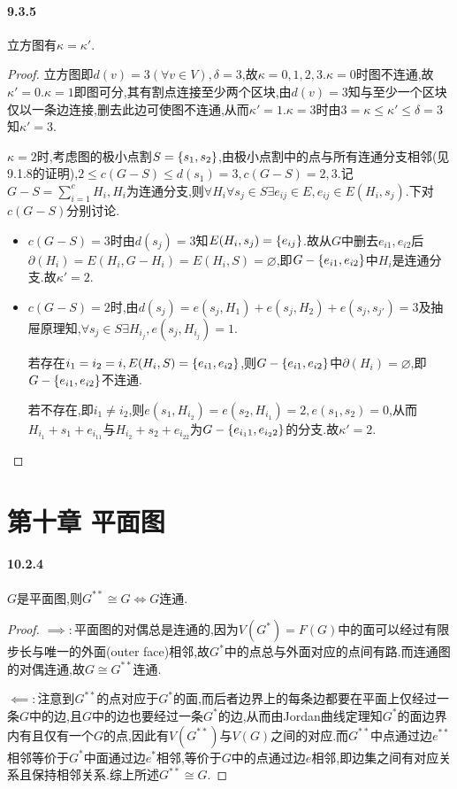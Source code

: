 \documentclass[11pt]{article}
\begin{document}
\paragraph{9.3.5}立方图有$\kappa=\kappa'$.
\begin{proof}
    立方图即$d(v)=3(\forall v\in V), \delta=3$,故$\kappa=0,1,2,3$.$\kappa=0$时图不连通,故$\kappa'=0$.$\kappa=1$即图可分,其有割点连接至少两个区块,由$d(v)=3$知与至少一个区块仅以一条边连接,删去此边可使图不连通,从而$\kappa'=1$.$\kappa=3$时由$3=\kappa\leq\kappa'\leq\delta=3$知$\kappa'=3$.
    
    $\kappa=2$时,考虑图的极小点割$S=\left\{s_1,s_2\right\}$,由极小点割中的点与所有连通分支相邻(见9.1.8的证明),$2\leq c(G-S)\leq d(s_1)=3, c(G-S)=2,3$.记$G-S=\sum_{i=1}^{c}H_i, H_i$为连通分支,则$\forall H_i\forall s_j\in S\exists e_{ij}\in E, e_{ij}\in E(H_i,s_j)$.下对$c(G-S)$分别讨论.
    \begin{itemize}
        \item $c(G-S)=3$时由$d(s_j)=3$知$E(H_i,s_j)=\left\{e_{ij}\right\}$.故从$G$中删去$e_{i1},e_{i2}$后$\partial(H_i)=E(H_i,G-H_i)=E(H_i,S)=\varnothing$,即$G-\left\{e_{i1},e_{i2}\right\}$中$H_i$是连通分支.故$\kappa'=2$.
        \item $c(G-S)=2$时,由$d(s_j)=e(s_j,H_1)+e(s_j,H_2)+e(s_j,s_{j'})=3$及抽屉原理知,$\forall s_j\in S\exists H_{i_j}, e(s_j,H_{i_j})=1$.
        
        若存在$i_1=i_2=i, E(H_i,S)=\left\{e_{i1},e_{i2}\right\}$,则$G-\left\{e_{i1},e_{i2}\right\}$中$\partial(H_i)=\varnothing$,即$G-\left\{e_{i1},e_{i2}\right\}$不连通.
        
        若不存在,即$i_1\neq i_2$,则$e(s_1,H_{i_2})=e(s_2,H_{i_1})=2, e(s_1,s_2)=0$,从而$H_{i_1}+s_1+e_{i_11}$与$H_{i_2}+s_2+e_{i_22}$为$G-\left\{e_{i_11},e_{i_22}\right\}$的分支.故$\kappa'=2$.
    \end{itemize}\vspace{-0.8cm}
\end{proof}

\section{第十章\; 平面图}
\paragraph{10.2.4}$G$是平面图,则$G^{**}\cong G\iff G$连通.
\begin{proof}
    $\implies:$平面图的对偶总是连通的,因为$V(G^*)=F(G)$中的面可以经过有限步长与唯一的外面(outer face)相邻,故$G^*$中的点总与外面对应的点间有路.而连通图的对偶连通,故$G\cong G^{**}$连通.

    $\impliedby:$注意到$G^{**}$的点对应于$G^*$的面,而后者边界上的每条边都要在平面上仅经过一条$G$中的边,且$G$中的边也要经过一条$G^*$的边,从而由Jordan曲线定理知$G^*$的面边界内有且仅有一个$G$的点,因此有$V(G^{**})$与$V(G)$之间的对应.而$G^{**}$中点通过边$e^{**}$相邻等价于$G^*$中面通过边$e^{*}$相邻,等价于$G$中的点通过边$e$相邻,即边集之间有对应关系且保持相邻关系.综上所述$G^{**}\cong G$.
\end{proof}
\end{document}
